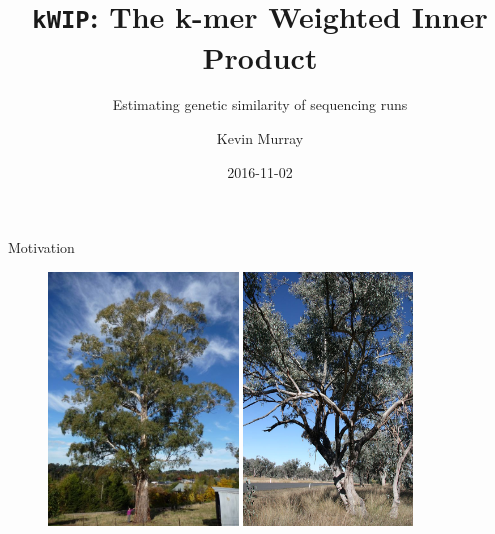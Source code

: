 \documentclass[t]{beamer}
\title{\texttt{kWIP}: The k-mer Weighted Inner Product}
\subtitle{Estimating genetic similarity of sequencing runs}
\author{Kevin Murray}
\institute{PhD Candidate\\ Borevitz Lab, ANU}
\date{2016-11-02}
\begin{document}
{
\begin{frame}
  \titlepage
  \vfill
\end{frame}
}

\begin{frame}{Motivation}
  \begin{figure}
    \centering
    \includegraphics[width=0.45\textwidth]{img/euc.jpg}
    \includegraphics[width=0.4\textwidth]{img/albens.jpg}
  \end{figure}
\end{frame}
\end{document}
